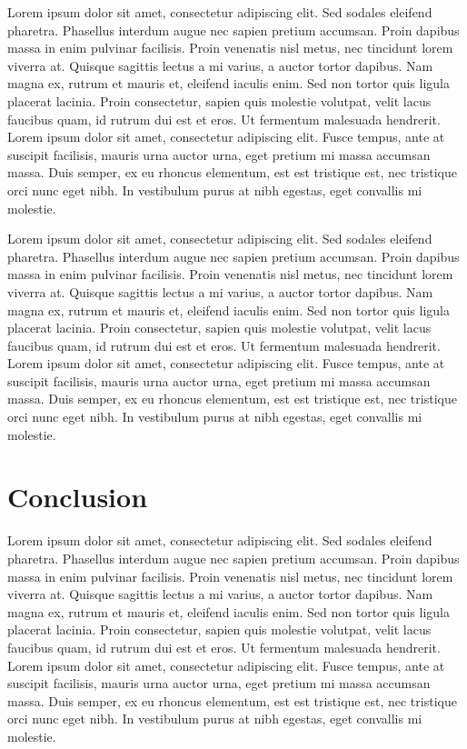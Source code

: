 Lorem ipsum dolor sit amet, consectetur adipiscing elit. Sed sodales
eleifend pharetra. Phasellus interdum augue nec sapien pretium accumsan.
Proin dapibus massa in enim pulvinar facilisis. Proin venenatis nisl metus,
nec tincidunt lorem viverra at. Quisque sagittis lectus a mi varius, a
auctor tortor dapibus. Nam magna ex, rutrum et mauris et, eleifend iaculis
enim. Sed non tortor quis ligula placerat lacinia. Proin consectetur, sapien
quis molestie volutpat, velit lacus faucibus quam, id rutrum dui est et
eros. Ut fermentum malesuada hendrerit. Lorem ipsum dolor sit amet,
consectetur adipiscing elit. Fusce tempus, ante at suscipit facilisis,
mauris urna auctor urna, eget pretium mi massa accumsan massa. Duis semper,
ex eu rhoncus elementum, est est tristique est, nec tristique orci nunc eget
nibh. In vestibulum purus at nibh egestas, eget convallis mi molestie.

Lorem ipsum dolor sit amet, consectetur adipiscing elit. Sed sodales
eleifend pharetra. Phasellus interdum augue nec sapien pretium accumsan.
Proin dapibus massa in enim pulvinar facilisis. Proin venenatis nisl metus,
nec tincidunt lorem viverra at. Quisque sagittis lectus a mi varius, a
auctor tortor dapibus. Nam magna ex, rutrum et mauris et, eleifend iaculis
enim. Sed non tortor quis ligula placerat lacinia. Proin consectetur, sapien
quis molestie volutpat, velit lacus faucibus quam, id rutrum dui est et
eros. Ut fermentum malesuada hendrerit. Lorem ipsum dolor sit amet,
consectetur adipiscing elit. Fusce tempus, ante at suscipit facilisis,
mauris urna auctor urna, eget pretium mi massa accumsan massa. Duis semper,
ex eu rhoncus elementum, est est tristique est, nec tristique orci nunc eget
nibh. In vestibulum purus at nibh egestas, eget convallis mi molestie.


\section{Conclusion}
Lorem ipsum dolor sit amet, consectetur adipiscing elit. Sed sodales
eleifend pharetra. Phasellus interdum augue nec sapien pretium accumsan.
Proin dapibus massa in enim pulvinar facilisis. Proin venenatis nisl metus,
nec tincidunt lorem viverra at. Quisque sagittis lectus a mi varius, a
auctor tortor dapibus. Nam magna ex, rutrum et mauris et, eleifend iaculis
enim. Sed non tortor quis ligula placerat lacinia. Proin consectetur, sapien
quis molestie volutpat, velit lacus faucibus quam, id rutrum dui est et
eros. Ut fermentum malesuada hendrerit. Lorem ipsum dolor sit amet,
consectetur adipiscing elit. Fusce tempus, ante at suscipit facilisis,
mauris urna auctor urna, eget pretium mi massa accumsan massa. Duis semper,
ex eu rhoncus elementum, est est tristique est, nec tristique orci nunc eget
nibh. In vestibulum purus at nibh egestas, eget convallis mi molestie.

